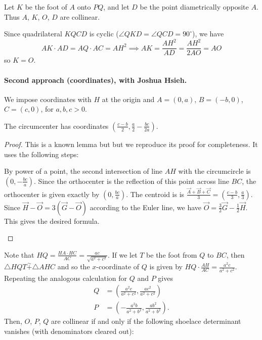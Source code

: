 \documentclass[11pt]{scrartcl}
\begin{document}
Let $K$ be the foot of $A$ onto $PQ$,
and let $D$ be the point diametrically opposite $A$.
Thus $A$, $K$, $O$, $D$ are collinear.

Since quadrilateral $KQCD$ is cyclic ($\angle QKD = \angle QCD = 90^\circ$),
we have
\[ AK \cdot AD = AQ \cdot AC = AH^2
  \implies AK = \frac{AH^2}{AD} = \frac{AH^2}{2AO} = AO \]
so $K = O$.

\paragraph{Second approach (coordinates), with Joshua Hsieh.}
We impose coordinates with $H$ at the origin
and $A = (0,a)$, $B = (-b,0)$, $C = (c,0)$, for $a,b,c > 0$.

\begin{claim*}
  The circumcenter has coordinates $(\frac{c-b}{2}, \frac a2 - \frac{bc}{2a})$.
\end{claim*}
\begin{proof}
  This is a known lemma but but we reproduce its proof for completeness.
  It uses the following steps:
  \begin{itemize}
    \ii By power of a point, the second intersection
    of line $AH$ with the circumcircle is $(0, -\frac{bc}{a})$.
    \ii Since the orthocenter is the reflection of this point across line $BC$,
    the orthocenter is given exactly by $(0, \frac{bc}{a})$.
    \ii The centroid is is $\frac{\vec A + \vec B + \vec C}{3} = (\frac{c-b}{3}, \frac a3)$.
    \ii Since $\vec H - \vec O = 3( \vec G - \vec O)$
    according to the Euler line, we have $\vec O = \frac 32 \vec G - \frac 12 \vec H$.
    This gives the desired formula. \qedhere
  \end{itemize}
\end{proof}
Note that $HQ = \frac{HA \cdot HC}{AC} = \frac{ac}{\sqrt{a^2+c^2}}$.
If we let $T$ be the foot from $Q$ to $BC$,
then $\triangle HQT \overset{\sim}{+} \triangle AHC$
and so the $x$-coordinate of $Q$ is given by
$HQ \cdot \frac{AH}{AC} = \frac{a^2c}{a^2+c^2}$.
Repeating the analogous calculation for $Q$ and $P$ gives
\begin{align*}
  Q &= \left( \frac{a^2 c}{a^2+c^2}, \frac{ac^2}{a^2+c^2} \right) \\
  P &= \left( -\frac{a^2 b}{a^2+b^2}, \frac{ab^2}{a^2+b^2} \right).
\end{align*}
Then, $O$, $P$, $Q$ are collinear if and only if the
following shoelace determinant vanishes
(with denominators cleared out):
\end{document}
